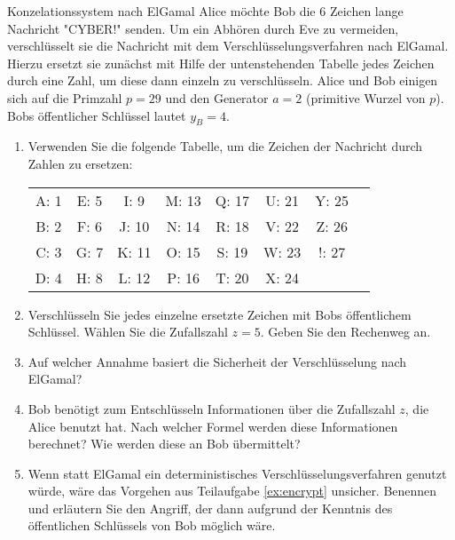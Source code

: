 \documentclass{article}
\begin{document}
\begin{exercise}{Konzelationssystem nach ElGamal}
  Alice möchte Bob die 6 Zeichen lange Nachricht "CYBER!" senden. Um ein Abhören durch Eve zu vermeiden, verschlüsselt sie die Nachricht mit dem Verschlüsselungsverfahren nach ElGamal. Hierzu ersetzt sie zunächst mit Hilfe der untenstehenden Tabelle jedes Zeichen durch eine Zahl, um diese dann einzeln zu verschlüsseln. Alice und Bob einigen sich auf die Primzahl $p=29$ und den Generator $a=2$ (primitive Wurzel von $p$). Bobs öffentlicher Schlüssel lautet $y_B=4$.
  \begin{enumerate}
    \item Verwenden Sie die folgende Tabelle, um die Zeichen der Nachricht durch Zahlen zu ersetzen:
      \begin{table}
        \centering
        \begin{tabular}{cccccccc}
          A: 1 & E: 5 & I: 9 & M: 13 & Q: 17 & U: 21 & Y: 25 \\
          B: 2 & F: 6 & J: 10 & N: 14 & R: 18 & V: 22 & Z: 26 \\
          C: 3 & G: 7 & K: 11 & O: 15 & S: 19 & W: 23 & !: 27 \\
          D: 4 & H: 8 & L: 12 & P: 16 & T: 20 & X: 24 & \\
        \end{tabular}
      \end{table}
    \item\label{ex:encrypt} Verschlüsseln Sie jedes einzelne ersetzte Zeichen mit Bobs öffentlichem Schlüssel. Wählen Sie die Zufallszahl $z=5$. Geben Sie den Rechenweg an.
    \item Auf welcher Annahme basiert die Sicherheit der Verschlüsselung nach ElGamal?
    \item Bob benötigt zum Entschlüsseln Informationen über die Zufallszahl $z$, die Alice benutzt hat. Nach welcher Formel werden diese Informationen berechnet? Wie werden diese an Bob übermittelt?
    \item Wenn statt ElGamal ein deterministisches Verschlüsselungsverfahren genutzt würde, wäre das Vorgehen aus Teilaufgabe \ref{ex:encrypt} unsicher. Benennen und erläutern Sie den Angriff, der dann aufgrund der Kenntnis des öffentlichen Schlüssels von Bob möglich wäre.
  \end{enumerate}


\end{exercise}
\end{document}

